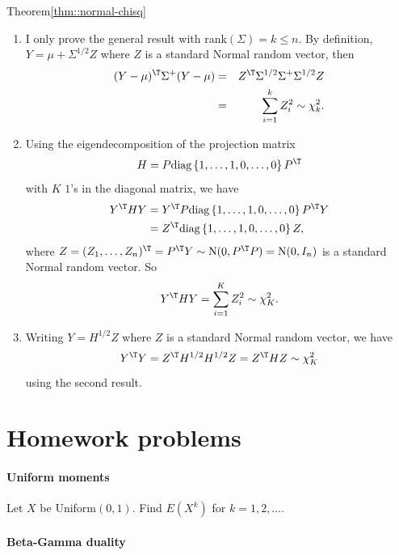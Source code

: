 \begin{myproof}{Theorem}{\ref{thm::normal-chisq}}
\begin{enumerate}
\item 
I only prove the general result with rank$(\Sigma) = k \leq n$.
By definition, $Y=\mu+\Sigma^{1/2}Z$ where $Z$ is a standard Normal
random vector, then
\begin{eqnarray*}
(Y-\mu)^{\T}\Sigma^{+}(Y-\mu)
&=&  Z^{\T}\Sigma^{1/2}\Sigma^{+}\Sigma^{1/2}Z \\
&=&  \sum_{i=1}^k Z_i^2  \sim  \chi_k^{2}.
\end{eqnarray*}
\item Using the eigendecomposition of the projection matrix
\[
H=P\text{diag}\left\{ 1,\ldots,1,0,\ldots,0\right\} P^{\T}
\]
with $K$ $1$'s in the diagonal matrix, we have
\begin{align*}
Y^{\T}HY & =Y^{\T}P\text{diag}\left\{ 1,\ldots,1,0,\ldots,0\right\} P^{\T}Y\\
 & =Z^{\T}\text{diag}\left\{ 1,\ldots,1,0,\ldots,0\right\} Z,
\end{align*}
where $Z=(Z_{1},\ldots,Z_{n})^{\T}=P^{\T}Y\sim\text{N}(0,P^{\T}P)=\text{N}(0,I_{n})$
is a standard Normal random vector. So
\[
Y^{\T}HY=\sum_{i=1}^{K}Z_{i}^{2}\sim\chi_{K}^{2}.
\]
\item Writing $Y=H^{1/2}Z$ where $Z$ is a standard Normal random vector,
we have 
\[
Y^{\T}Y=Z^{\T}H^{1/2}H^{1/2}Z=Z^{\T}HZ\sim\chi_{K}^{2}
\]
using the second result. 
\end{enumerate}
\end{myproof} 





\section{Homework problems}



\paragraph{Uniform moments}\label{hwmath2::uniform-moments}

Let $X$ be Uniform$(0,1)$. Find $E(X^k)$ for $k=1, 2, \ldots$. 



\paragraph{Beta-Gamma duality}\label{hwmath2::beta-gamma-dual}


